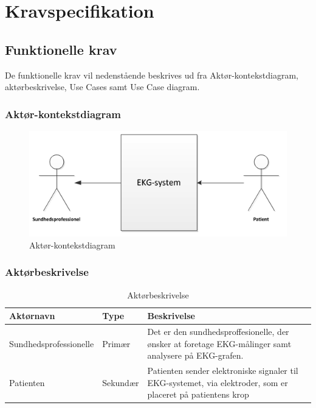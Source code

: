 \chapter{Kravspecifikation}

\section{Funktionelle krav}
De funktionelle krav vil nedenstående beskrives ud fra Aktør-kontekstdiagram, aktørbeskrivelse, Use Cases samt Use Case diagram. 

\subsection{Aktør-kontekstdiagram}

\begin{figure}[htb]
	\centering
	\includegraphics[width=1\textwidth]{Figurer/Snip20150226_1}
	\caption{Aktør-kontekstdiagram}
	\label{fig:aktoerbeskrivelse}
\end{figure}

\subsection{Aktørbeskrivelse}

\begin{table}[H]
\begin{tabularx}{\textwidth}{l l X}
    \toprule
     Aktørnavn  & Type      & Beskrivelse \\ \midrule
     Sundhedsprofessionelle   & Primær    & Det er den sundhedsproffesionelle, der ønsker at foretage EKG-målinger samt analysere på EKG-grafen.\\ 						  									  \addlinespace[2mm]
     Patienten & Sekundær  & Patienten sender elektroniske signaler til EKG-systemet, via elektroder, som er placeret på patientens krop\\                                                                                                                                                                            
   
     \bottomrule                                                                                                                   
    \end{tabularx}
    \caption {Aktørbeskrivelse}
    \label{tab:aktoerbeskrivelse}
	
\end{table}

